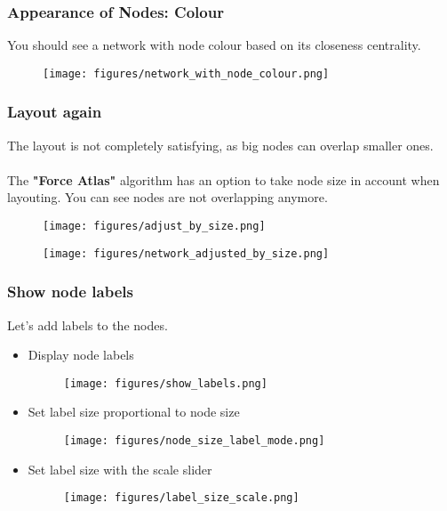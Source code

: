 \documentclass[10pt]{beamer}
\begin{document}
\begin{frame}
\frametitle{Appearance of Nodes: Colour}
You should see a network with node colour based on its closeness centrality.
\begin{figure}
\texttt{[image: figures/network\_with\_node\_colour.png]}
\end{figure}
\end{frame}

\begin{frame}
\frametitle{Layout again}
The layout is not completely satisfying, as big nodes can overlap smaller ones. \\~\\

The \textbf{"Force Atlas"} algorithm has an option to take node size in account when layouting. You can see nodes are not overlapping anymore.

\begin{figure}
\centering
\begin{minipage}{.45\textwidth}
\centering
\texttt{[image: figures/adjust\_by\_size.png]}
\end{minipage}
\begin{minipage}{.45\textwidth}
\centering
\texttt{[image: figures/network\_adjusted\_by\_size.png]}
\end{minipage}
\end{figure}
\end{frame}

\begin{frame}
\frametitle{Show node labels}
Let's add labels to the nodes.

\begin{itemize}
	\item Display node labels
	\begin{figure}
		\texttt{[image: figures/show\_labels.png]}
	\end{figure}
	\item Set label size proportional to node size
	\begin{figure}
		\texttt{[image: figures/node\_size\_label\_mode.png]}
	\end{figure}
	\item Set label size with the scale slider
	\begin{figure}
		\texttt{[image: figures/label\_size\_scale.png]}
	\end{figure}
\end{itemize}
\end{frame}
\end{document}
